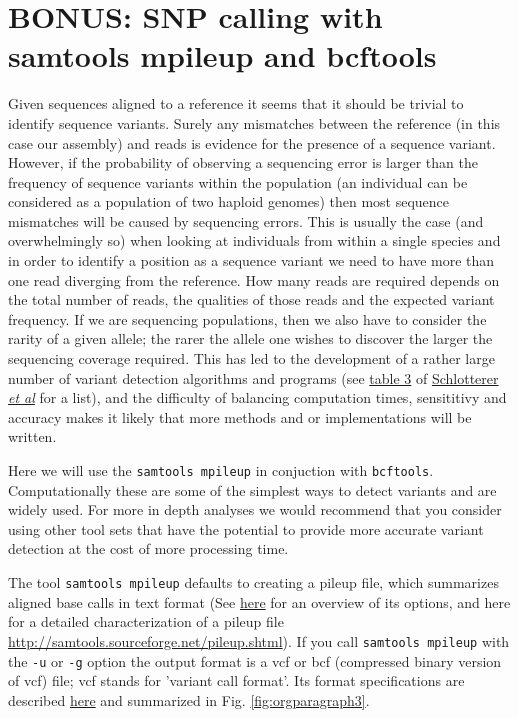 \documentclass[11pt]{article}
\begin{document}
\section{BONUS: SNP calling with samtools mpileup and bcftools}
\label{sec:orgheadline10}
Given sequences aligned to a reference it seems that it should be trivial to
identify sequence variants. Surely any mismatches between the reference (in this case our assembly)
and reads is evidence for the
presence of a sequence variant. However, if the probability of observing a
sequencing error is larger than the frequency of sequence variants within the
population (an individual can be considered as a population of
two haploid genomes) then most sequence mismatches will be caused by
sequencing errors. This is usually the case (and overwhelmingly so) when looking at individuals from
within a single species and in order to identify a position as a sequence
variant we need to have more than one read diverging from the reference. How
many reads are required depends on the total number of reads, the qualities
of those reads and the expected variant frequency. If we are sequencing
populations, then we also have to consider the rarity of a given allele;
the rarer the allele one wishes to discover the larger the sequencing coverage
required. This has led to the
development of a rather large number of variant detection algorithms and
programs (see
\href{http://www.nature.com/nrg/journal/v15/n11/fig_tab/nrg3803_T3.html}{table 3} of \href{http://www.nature.com/nrg/journal/v15/n11/full/nrg3803.html}{Schlotterer \emph{et al}} for a list), and the difficulty of balancing
computation times, sensititivy and accuracy makes it likely that more methods
and or implementations will be written.

Here we will use the \texttt{samtools mpileup} in conjuction with 
\texttt{bcftools}. Computationally these are some of the simplest ways to detect variants
and are widely used. For more in depth analyses we would recommend that you
consider using other tool sets that have the potential to provide more
accurate variant detection at the cost of more processing time.

The tool \texttt{samtools mpileup} defaults to creating a pileup file, which summarizes aligned
base calls in text format (See \href{http://samtools.sourceforge.net/samtools.shtml}{here} for an overview of its options, and here for a detailed characterization of
a pileup file \url{http://samtools.sourceforge.net/pileup.shtml}). If you
call \texttt{samtools mpileup} with the \texttt{-u} or \texttt{-g} option the
output format is a vcf or bcf (compressed binary version of vcf) file;
vcf stands for 'variant call format'. Its format specifications are
described \href{https://samtools.github.io/hts-specs/VCFv4.2.pdf}{here} and summarized in Fig. \ref{fig:orgparagraph3}.
\end{document}
